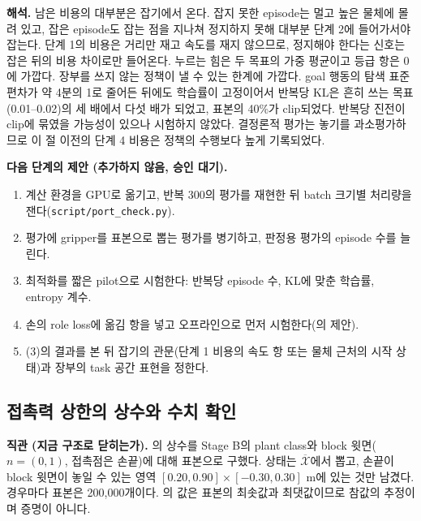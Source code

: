 \documentclass[11pt]{article}\usepackage[margin=1in]{geometry}\usepackage{amsmath,amssymb,amsthm,mathtools}\usepackage{graphicx}\graphicspath{{figures/}{../figures/}{figs/}{./}}\usepackage{enumitem}\usepackage{hyperref}\usepackage{cleveref}\usepackage{tikz}\usetikzlibrary{arrows.meta,positioning,calc,shapes.geometric}\usepackage{float}\usepackage{rotating}\usepackage[most]{tcolorbox}\usepackage{kotex}\usepackage{booktabs}\usepackage{longtable}\emergencystretch=1.6em\tolerance=2000 \crefname{assumption}{Assumption}{Assumptions}\Crefname{assumption}{Assumption}{Assumptions}\crefname{definition}{Definition}{Definitions}\Crefname{definition}{Definition}{Definitions}\crefname{proposition}{Proposition}{Propositions}\Crefname{proposition}{Proposition}{Propositions}\crefname{fact}{Fact}{Facts}\Crefname{fact}{Fact}{Facts} \newtheorem{assumption}{Assumption}\newtheorem{definition}{Definition}\newtheorem{lemma}{Lemma}\newtheorem{proposition}{Proposition}\newtheorem{theorem}{Theorem}\newtheorem{corollary}{Corollary}\newtheorem{fact}{Fact}\theoremstyle{remark}\newtheorem{remark}{Remark} \newcommand{\R}{\mathbb{R}}\newcommand{\xb}{\bar x}\newcommand{\Ab}{\bar A}\newcommand{\By}{\bar B_y}\newcommand{\U}{\mathcal U}\newcommand{\Z}{\mathcal Z}
\begin{document}
\textbf{해석.} 남은 비용의 대부분은 잡기에서 온다. 잡지 못한 episode는 멀고 높은 물체에 몰려 있고, 잡은 episode도 잡는 점을 지나쳐 정지하지 못해 대부분 단계 2에 들어가서야 잡는다. 단계 1의 비용은 거리만 재고 속도를 재지 않으므로, 정지해야 한다는 신호는 잡은 뒤의 비용 차이로만 들어온다. 누르는 힘은 두 목표의 가중 평균이고 등급 항은 0에 가깝다. 장부를 쓰지 않는 정책이 낼 수 있는 한계에 가깝다. goal 행동의 탐색 표준편차가 약 4분의 1로 줄어든 뒤에도 학습률이 고정이어서 반복당 KL은 흔히 쓰는 목표(0.01--0.02)의 세 배에서 다섯 배가 되었고, 표본의 40\%가 clip되었다. 반복당 진전이 clip에 묶였을 가능성이 있으나 시험하지 않았다. 결정론적 평가는 놓기를 과소평가하므로 이 절 이전의 단계 4 비용은 정책의 수행보다 높게 기록되었다.

\textbf{다음 단계의 제안 (추가하지 않음, 승인 대기).}
\begin{enumerate}[label=(\arabic*)]
\item 계산 환경을 GPU로 옮기고, 반복 300의 평가를 재현한 뒤 batch 크기별 처리량을 잰다(\texttt{script/port\_check.py}).
\item 평가에 gripper를 표본으로 뽑는 평가를 병기하고, 판정용 평가의 episode 수를 늘린다.
\item 최적화를 짧은 pilot으로 시험한다: 반복당 episode 수, KL에 맞춘 학습률, entropy 계수.
\item 손의 role loss에 옮김 항을 넣고 오프라인으로 먼저 시험한다(의 제안).
\item (3)의 결과를 본 뒤 잡기의 관문(단계 1 비용의 속도 항 또는 물체 근처의 시작 상태)과 장부의 task 공간 표현을 정한다.
\end{enumerate}

\subsection{접촉력 상한의 상수와 수치 확인}
\label{sec:contactnum}

\textbf{직관 (지금 구조로 닫히는가).} 의 상수를 Stage B의 plant class와 block 윗면($n=(0,1)$, 접촉점은 손끝)에 대해 표본으로 구했다. 상태는 $\overline{\mathcal X}$에서 뽑고, 손끝이 block 윗면이 놓일 수 있는 영역 $[0.20,0.90]\times[-0.30,0.30]$ m에 있는 것만 남겼다. 경우마다 표본은 200{,}000개이다. 의 값은 표본의 최솟값과 최댓값이므로 참값의 추정이며 증명이 아니다.
\end{document}
